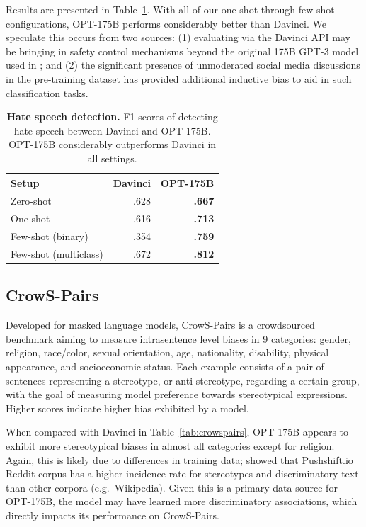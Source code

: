 \documentclass[11pt]{article}
\newcommand{\OPT}[0]{{OPT-175B}}
\newcommand{\davinci}[0]{{Davinci}}
\newcommand{\biggpt}[1]{{GPT-3#1}}
\begin{document}
Results are presented in Table~\ref{tab:hatespeech}.
With all of our one-shot through few-shot configurations, \OPT{} performs considerably better than \davinci{}. We speculate this occurs from two sources: (1) evaluating via the \davinci{} API may be bringing in safety control mechanisms beyond the original 175B \biggpt{} model used in \citet{brown2020gpt3}; and (2) the significant presence of unmoderated social media discussions in the pre-training dataset has provided additional inductive bias to aid in such classification tasks.

\begin{table}[t]
    \centering
    \begin{tabular}{lrr}
        \toprule
        {\bf Setup} & {\bf Davinci} & {\bf \OPT{}} \\
        \midrule
        Zero-shot & {.628} & {\bf .667}\\
        One-shot  & {.616} & {\bf .713}\\
        Few-shot (binary) & {.354} & {\bf .759}\\
        Few-shot (multiclass) & {.672} & {\bf.812}\\
        \bottomrule
    \end{tabular}
    \caption{{\bf Hate speech detection.} F1 scores of detecting hate speech between \davinci{} and \OPT{}. \OPT{} considerably outperforms \davinci{} in all settings.
    }
    \label{tab:hatespeech}
\end{table}

\subsection{CrowS-Pairs}
Developed for masked language models, CrowS-Pairs \cite{nangia2020crows} is a crowdsourced benchmark aiming to measure intrasentence level biases in 9 categories: gender, religion, race/color, sexual orientation, age, nationality, disability, physical appearance, and socioeconomic status. Each example consists of a pair of sentences representing a stereotype, or anti-stereotype, regarding a certain group, with the goal of measuring model preference towards stereotypical expressions.  Higher scores indicate higher bias exhibited by a model.

When compared with \davinci{} in Table~\ref{tab:crowspairs}, \OPT{} appears to exhibit more stereotypical biases in almost all categories except for religion.  Again, this is likely due to differences in training data;  \citet{nangia2020crows} showed that Pushshift.io Reddit corpus has a higher incidence rate for stereotypes and discriminatory text than other corpora (e.g.~Wikipedia). Given this is a primary data source for \OPT{}, the model may have learned more discriminatory associations, which directly impacts its performance on CrowS-Pairs. 
\end{document}
